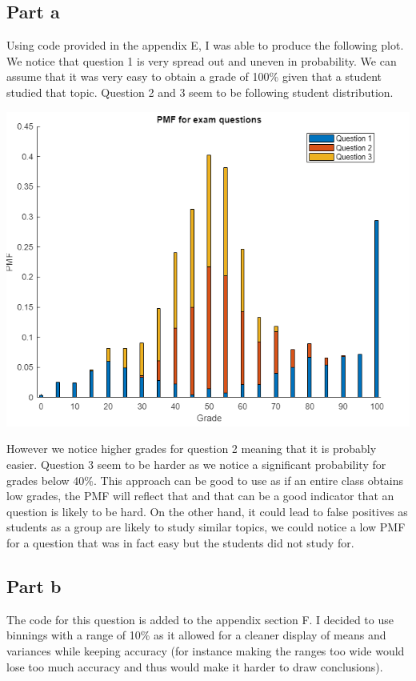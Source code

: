 \documentclass[10pt]{article}
\begin{document}
\subsection*{Part a}
Using code provided in the appendix E, I was able to produce the following
plot.  
We notice that question 1 is very spread out and uneven in probability. We can
assume that it was very easy to obtain a grade of 100\% given that a student studied that topic.
Question 2 and 3 seem to be following student distribution.
\begin{center}
    \includegraphics[scale=0.385]{final_pmf}
\end{center}
However we notice higher grades for question 2 meaning that it is probably easier.
Question 3 seem to be harder as we notice a significant probability for grades below 40\%.
This approach can be good to use as if an entire class obtains low grades, the PMF will reflect that and 
that can be a good indicator that an question is likely to be hard.
On the other hand, it could lead to false positives as students as a group are likely to study
similar topics, we could notice a low PMF for a question that was in fact easy but the students did not
study for.

\subsection*{Part b}
The code for this question is added to the appendix section F. I decided to use binnings
with a range of 10\% as it allowed for a cleaner display of means and variances while keeping 
accuracy (for instance making the ranges too wide would lose too much accuracy and thus would 
make it harder to draw conclusions).
\end{document}
